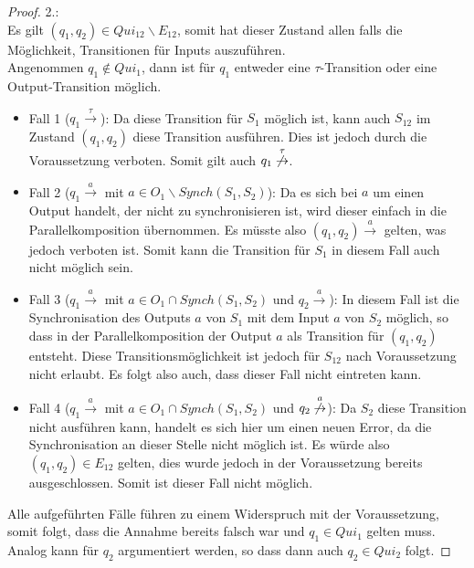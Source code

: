 \begin{proof}
  2.:\\
  Es gilt $(q_1,q_2)\in Qui_{12}\backslash E_{12}$, somit hat
  dieser Zustand allen falls die Möglichkeit, Transitionen für Inputs
  auszuführen.\\
  Angenommen $q_1\notin Qui_1$, dann ist für $q_1$ entweder eine
  $\tau$-Transition oder eine Output-Transition möglich.
  \begin{itemize}
    \item Fall 1 ($q_1 \overset{\tau}{\rightarrow}$): Da diese Transition für
      $S_1$ möglich ist, kann auch $S_{12}$ im Zustand $(q_1,q_2)$ diese
      Transition ausführen. Dies ist jedoch durch die Voraussetzung verboten.
      Somit gilt auch $q_1 \overset{\tau}{\not{\hspace{-0.1cm}\rightarrow}}$.
    \item Fall 2 ($q_1 \overset{a}{\rightarrow}$ mit $a\in O_1\backslash
      Synch(S_1,S_2)$): Da es sich bei $a$ um einen Output handelt, der nicht
      zu synchronisieren ist, wird dieser einfach in die Parallelkomposition
      übernommen. Es müsste also $(q_1,q_2) \overset{a}{\rightarrow}$ gelten,
      was jedoch verboten ist. Somit kann die Transition für $S_1$ in diesem
      Fall auch nicht möglich sein.
    \item Fall 3 ($q_1 \overset{a}{\rightarrow}$ mit $a\in O_1\cap
      Synch(S_1,S_2)$ und $q_2 \overset{a}{\rightarrow}$): In diesem Fall ist
      die Synchronisation des Outputs $a$ von $S_1$ mit dem Input $a$ von $S_2$
      möglich, so dass in der Parallelkomposition der Output $a$ als Transition
      für $(q_1,q_2)$ entsteht. Diese Transitionsmöglichkeit ist jedoch für
      $S_{12}$ nach Voraussetzung nicht erlaubt. Es folgt also auch, dass
      dieser Fall nicht eintreten kann.
    \item Fall 4 ($q_1 \overset{a}{\rightarrow}$ mit $a\in O_1\cap
      Synch(S_1,S_2)$ und $q_2 \overset{a}{\not{\hspace{-0.1cm}\rightarrow}}$):
      Da $S_2$ diese Transition nicht ausführen kann, handelt es sich hier um
      einen neuen Error, da die Synchronisation an dieser Stelle nicht möglich
      ist. Es würde also $(q_1,q_2)\in E_{12}$ gelten, dies wurde jedoch in der
      Voraussetzung bereits ausgeschlossen. Somit ist dieser Fall nicht
      möglich.
  \end{itemize}
  Alle aufgeführten Fälle führen zu einem Widerspruch mit der Voraussetzung,
  somit folgt, dass die Annahme bereits falsch war und $q_1\in Qui_1$ gelten
  muss. Analog kann für $q_2$ argumentiert werden, so dass dann auch $q_2\in
  Qui_2$ folgt.
\end{proof}

